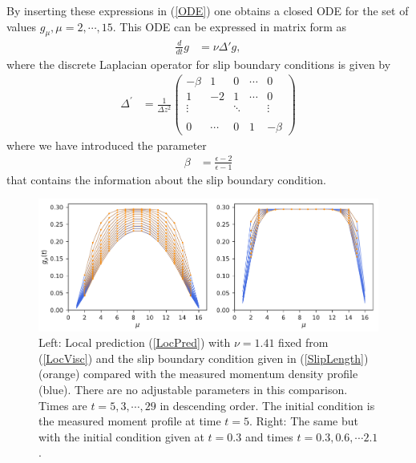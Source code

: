 \documentclass[b5paper,openright,10pt]{book}
\begin{document}
By inserting these expressions in (\ref{ODE}) one obtains a closed
ODE for the set of values ${g}_\mu,\mu=2,\cdots,15$. This
ODE can be expressed in matrix form as
\begin{align}
  \frac{d}{dt}{g}&=\nu \Delta' {g},
\label{closedODE}
\end{align}
where the discrete Laplacian operator  for slip boundary conditions is
given by
\begin{align}
\Delta^\prime&
=\frac{1}{\Delta z^2}\left(
    \begin{array}{crrrc}
-\beta &1&0&\cdots&0\\
1&-2&1&\cdots&0\\
\vdots      &&\ddots&&\vdots\\
\\
0&\cdots&0&1&-\beta \end{array}
\right)
\end{align}
where we have introduced the parameter
\begin{align}
\beta&=  \frac{\epsilon-2}{\epsilon-1}
\end{align}
that contains  the information about  the slip boundary  condition.

\begin{figure}[]
\includegraphics[width=\linewidth]{gxtLocalPrediction-17nodes-WALLS}
\caption[Local prediction from local viscosity and slip boundary condition]{Left: Local  prediction (\ref{LocPred}) with  $\nu=1.41$ fixed
  from  (\ref{LocVisc})  and  the  slip boundary  condition  given  in
  (\ref{SlipLength}) (orange) compared with the measured momentum density
  profile  (blue).   There  are   no  adjustable  parameters  in  this
  comparison. Times  are $t=5,3,\cdots,29$  in descending  order.  The
  initial   condition  is   the  measured   moment  profile   at  time
  $t=5$.  Right: The  same but  with the  initial condition  given at
  $t=0.3$ and times $t=0.3,0.6,\cdots2.1$.}
\label{Fig:LocalPrediction}
\end{figure}
\end{document}
